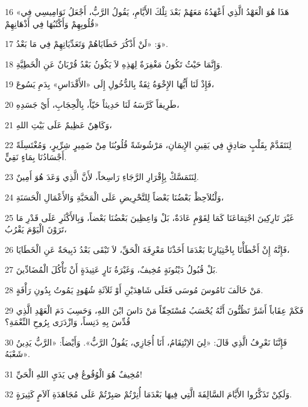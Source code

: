 \par 16 «هَذَا هُوَ الْعَهْدُ الَّذِي أَعْهَدُهُ مَعَهُمْ بَعْدَ تِلْكَ الأَيَّامِ، يَقُولُ الرَّبُّ، أَجْعَلُ نَوَامِيسِي فِي قُلُوبِهِمْ وَأَكْتُبُهَا فِي أَذْهَانِهِمْ»
\par 17 وَ: «لَنْ أَذْكُرَ خَطَايَاهُمْ وَتَعَدِّيَاتِهِمْ فِي مَا بَعْدُ».
\par 18 وَإِنَّمَا حَيْثُ تَكُونُ مَغْفِرَةٌ لِهَذِهِ لاَ يَكُونُ بَعْدُ قُرْبَانٌ عَنِ الْخَطِيَّةِ.
\par 19 فَإِذْ لَنَا أَيُّهَا الإِخْوَةُ ثِقَةٌ بِالدُّخُولِ إِلَى «الأَقْدَاسِ» بِدَمِ يَسُوعَ،
\par 20 طَرِيقاً كَرَّسَهُ لَنَا حَدِيثاً حَيّاً، بِالْحِجَابِ، أَيْ جَسَدِهِ،
\par 21 وَكَاهِنٌ عَظِيمٌ عَلَى بَيْتِ اللهِ،
\par 22 لِنَتَقَدَّمْ بِقَلْبٍ صَادِقٍ فِي يَقِينِ الإِيمَانِ، مَرْشُوشَةً قُلُوبُنَا مِنْ ضَمِيرٍ شِرِّيرٍ، وَمُغْتَسِلَةً أَجْسَادُنَا بِمَاءٍ نَقِيٍّ.
\par 23 لِنَتَمَسَّكْ بِإِقْرَارِ الرَّجَاءِ رَاسِخاً، لأَنَّ الَّذِي وَعَدَ هُوَ أَمِينٌ.
\par 24 وَلْنُلاَحِظْ بَعْضُنَا بَعْضاً لِلتَّحْرِيضِ عَلَى الْمَحَبَّةِ وَالأَعْمَالِ الْحَسَنَةِ،
\par 25 غَيْرَ تَارِكِينَ اجْتِمَاعَنَا كَمَا لِقَوْمٍ عَادَةٌ، بَلْ وَاعِظِينَ بَعْضُنَا بَعْضاً، وَبِالأَكْثَرِ عَلَى قَدْرِ مَا تَرَوْنَ الْيَوْمَ يَقْرُبُ،
\par 26 فَإِنَّهُ إِنْ أَخْطَأْنَا بِاخْتِيَارِنَا بَعْدَمَا أَخَذْنَا مَعْرِفَةَ الْحَقِّ، لاَ تَبْقَى بَعْدُ ذَبِيحَةٌ عَنِ الْخَطَايَا،
\par 27 بَلْ قُبُولُ دَيْنُونَةٍ مُخِيفٌ، وَغَيْرَةُ نَارٍ عَتِيدَةٍ أَنْ تَأْكُلَ الْمُضَادِّينَ.
\par 28 مَنْ خَالَفَ نَامُوسَ مُوسَى فَعَلَى شَاهِدَيْنِ أَوْ ثَلاَثَةِ شُهُودٍ يَمُوتُ بِدُونِ رَأْفَةٍ.
\par 29 فَكَمْ عِقَاباً أَشَرَّ تَظُنُّونَ أَنَّهُ يُحْسَبُ مُسْتَحِقّاً مَنْ دَاسَ ابْنَ اللهِ، وَحَسِبَ دَمَ الْعَهْدِ الَّذِي قُدِّسَ بِهِ دَنِساً، وَازْدَرَى بِرُوحِ النِّعْمَةِ؟
\par 30 فَإِنَّنَا نَعْرِفُ الَّذِي قَالَ: «لِيَ الاِنْتِقَامُ، أَنَا أُجَازِي، يَقُولُ الرَّبُّ». وَأَيْضاً: «الرَّبُّ يَدِينُ شَعْبَهُ».
\par 31 مُخِيفٌ هُوَ الْوُقُوعُ فِي يَدَيِ اللهِ الْحَيِّ!
\par 32 وَلَكِنْ تَذَكَّرُوا الأَيَّامَ السَّالِفَةَ الَّتِي فِيهَا بَعْدَمَا أُنِرْتُمْ صَبِرْتُمْ عَلَى مُجَاهَدَةِ آلاَمٍ كَثِيرَةٍ.
